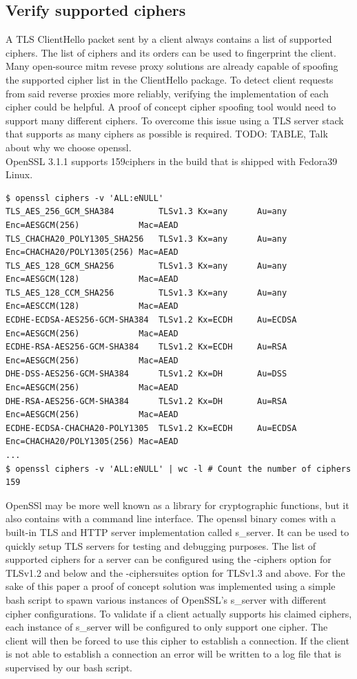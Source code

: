 \documentclass[12pt]{scrbook}
\begin{document}
  \newpage \subsection{Verify supported ciphers} A TLS ClientHello packet sent
  by a client always contains a list of supported ciphers. The list of ciphers
  and its orders can be used to fingerprint the client. Many open-source mitm
  revese proxy solutions are already capable of spoofing the supported cipher
  list in the ClientHello package. To detect client requests from said reverse
  proxies more reliably, verifying the implementation of each cipher could be
  helpful. A proof of concept cipher spoofing tool would need to support many
  different ciphers. To overcome this issue using a TLS server stack that
  supports as many ciphers as possible is required. TODO: TABLE, Talk about why
  we choose openssl.\\OpenSSL 3.1.1 supports 159ciphers in the build that is
  shipped with Fedora39 Linux.

\begin{lstlisting}[breaklines=true,basicstyle=\tiny]
$ openssl ciphers -v 'ALL:eNULL'
TLS_AES_256_GCM_SHA384         TLSv1.3 Kx=any      Au=any   Enc=AESGCM(256)            Mac=AEAD
TLS_CHACHA20_POLY1305_SHA256   TLSv1.3 Kx=any      Au=any   Enc=CHACHA20/POLY1305(256) Mac=AEAD
TLS_AES_128_GCM_SHA256         TLSv1.3 Kx=any      Au=any   Enc=AESGCM(128)            Mac=AEAD
TLS_AES_128_CCM_SHA256         TLSv1.3 Kx=any      Au=any   Enc=AESCCM(128)            Mac=AEAD
ECDHE-ECDSA-AES256-GCM-SHA384  TLSv1.2 Kx=ECDH     Au=ECDSA Enc=AESGCM(256)            Mac=AEAD
ECDHE-RSA-AES256-GCM-SHA384    TLSv1.2 Kx=ECDH     Au=RSA   Enc=AESGCM(256)            Mac=AEAD
DHE-DSS-AES256-GCM-SHA384      TLSv1.2 Kx=DH       Au=DSS   Enc=AESGCM(256)            Mac=AEAD
DHE-RSA-AES256-GCM-SHA384      TLSv1.2 Kx=DH       Au=RSA   Enc=AESGCM(256)            Mac=AEAD
ECDHE-ECDSA-CHACHA20-POLY1305  TLSv1.2 Kx=ECDH     Au=ECDSA Enc=CHACHA20/POLY1305(256) Mac=AEAD
...
$ openssl ciphers -v 'ALL:eNULL' | wc -l # Count the number of ciphers
159
\end{lstlisting}

OpenSSl may be more well known as a library for cryptographic functions, but it
also contains with a command line interface. The openssl binary comes with a
built-in TLS and HTTP server implementation called s\_server. It can be used to
quickly setup TLS servers for testing and debugging purposes. The list of
supported ciphers for a server can be configured using the -ciphers option for
TLSv1.2 and below and the -ciphersuites option for TLSv1.3 and above. For the
sake of this paper a proof of concept solution was implemented using a simple
bash script to spawn various instances of OpenSSL's s\_server with different
cipher configurations. To validate if a client actually supports his claimed
ciphers, each instance of s\_server will be configured to only support one
cipher. The client will then be forced to use this cipher to establish a
connection. If the client is not able to establish a connection an error will be
written to a log file that is supervised by our bash script.
\end{document}
